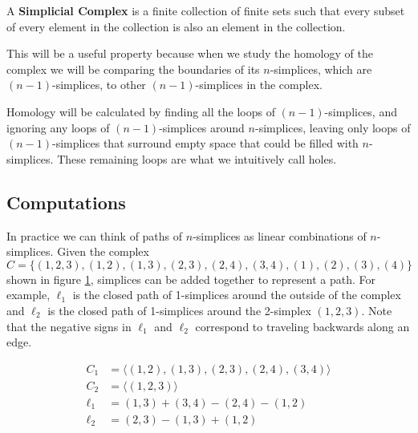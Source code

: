 \begin{definition}\label{def:simplicial-complex}
    A \textbf{Simplicial Complex} is a finite collection of finite sets such that every subset of every element in the collection is also an element in the collection. \cite{wagner}
\end{definition}

This will be a useful property because when we study the homology of the complex we will be comparing the boundaries of its \(n\)-simplices, which are \((n-1)\)-simplices, to other \((n-1)\)-simplices in the complex.

Homology will be calculated by finding all the loops of \((n-1)\)-simplices, and ignoring any loops of \((n-1)\)-simplices around \(n\)-simplices, leaving only loops of \((n-1)\)-simplices that surround empty space that could be filled with \(n\)-simplices.
These remaining loops are what we intuitively call holes.

\subsection{Computations}

In practice we can think of paths of \(n\)-simplices as linear combinations of \(n\)-simplices.
Given the complex \(C = \{ (1,2,3), (1,2), (1,3), (2,3), (2,4), (3,4), (1), (2), (3), (4) \}\) shown in figure \ref{fig:example-cech}, simplices can be added together to represent a path.
For example, \(\ell_1\) is the closed path of 1-simplices around the outside of the complex and \(\ell_2\) is the closed path of 1-simplices around the 2-simplex \((1,2,3)\).
Note that the negative signs in \(\ell_1\) and \(\ell_2\) correspond to traveling backwards along an edge.

\begin{figure}
    \centering
    \begin{minipage}{.5\textwidth}
        \centering
        
    \end{minipage}%
    \begin{minipage}{.5\textwidth}
        \begin{align*}
            C_1 &= \langle (1,2),(1,3),(2,3),(2,4),(3,4) \rangle \\
            C_2 &= \langle (1,2,3) \rangle \\
            \ell_1 &= (1,3) + (3,4) - (2,4) - (1,2)\\
            \ell_2 &= (2,3) - (1,3) + (1,2)
        \end{align*}
    \end{minipage}
    \caption{}
    \label{fig:example-cech}
\end{figure}

